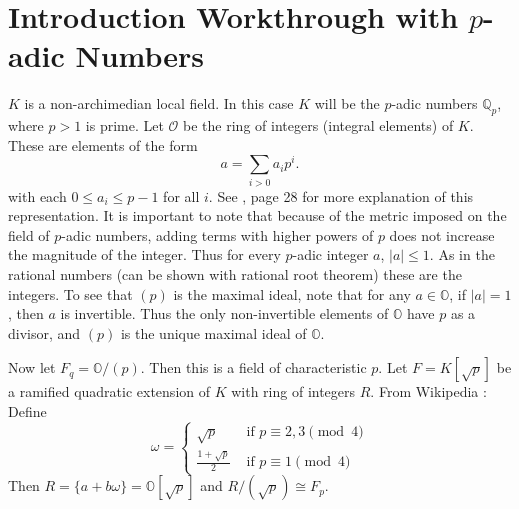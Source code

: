 \documentclass[11pt]{article}
\newcommand{\padic}{$p$-adic }
\begin{document}
\section{Introduction Workthrough with \padic Numbers}
$K$ is a non-archimedian local field. In this case $K$ will be the \padic numbers $\mathbb{Q}_p$, where $p > 1$ is prime.
Let 	$\mathcal{O}$ be the ring of integers (integral elements) of $K$. These are elements of the form
\[
a = \sum_{i > 0}a_i p^i.
\]
with each $0 \le a_i \le p - 1$ for all $i$. See \cite{katok}, page 28 for more explanation of this representation.
It is important to note that because of the metric imposed on the field of \padic numbers, adding terms with higher powers of $p$ does not increase the magnitude of the integer.
Thus for every \padic integer $a$, $|a| \le 1$.
As in the rational numbers (can be shown with rational root theorem) these are the integers.
To see that $(p)$ is the maximal ideal, note that for any $a \in \mathbb{O}$, if $|a| = 1$, then $a$ is invertible.
Thus the only non-invertible elements of $\mathbb{O}$ have $p$ as a divisor, and $(p)$ is the unique maximal ideal of $\mathbb{O}$.

Now let $F_q = \mathbb{O}/(p)$. Then this is a field of characteristic $p$.
Let $F = K[\sqrt{p}]$ be a ramified quadratic extension of $K$ with ring of integers $R$.
From Wikipedia \cite{wikipedia:quadratic-integer}: Define
\[
\omega = \begin{cases}
\sqrt{p} &\text{ if } p \equiv 2,3 \pmod{4}\\
\frac{1 + \sqrt{p}}{2} &\text{ if } p \equiv 1 \pmod{4}
\end{cases}
\]
Then $R = \{a + b \omega \} = \mathbb{O}[\sqrt{p}]$ and $R/(\sqrt{p}) \cong F_p$.



\end{document}
